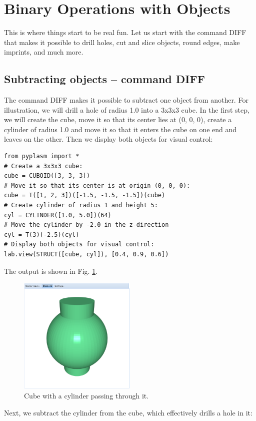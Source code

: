\documentclass[article,A4,12pt]{llncs}
\begin{document}
\section{Binary Operations with Objects}

This is where things start to be real fun. Let us start with the 
command DIFF that makes it possible to drill holes, cut and slice objects, 
round edges, make imprints, and much more.

\subsection{Subtracting objects -- command DIFF}

The command DIFF makes it possible to subtract one object from another.
For illustration, we will drill a hole of radius 1.0 into a 3x3x3 cube. In the first step,
we will create the cube, move it so that its center lies at (0, 0, 0), create
a cylinder of radius 1.0 and move it so that it enters the cube on one end and 
leaves on the other. Then we display both objects for visual control:

\begin{verbatim}
from pyplasm import *
# Create a 3x3x3 cube:
cube = CUBOID([3, 3, 3])
# Move it so that its center is at origin (0, 0, 0):
cube = T([1, 2, 3])([-1.5, -1.5, -1.5])(cube)
# Create cylinder of radius 1 and height 5:
cyl = CYLINDER([1.0, 5.0])(64)
# Move the cylinder by -2.0 in the z-direction 
cyl = T(3)(-2.5)(cyl)
# Display both objects for visual control:
lab.view(STRUCT([cube, cyl]), [0.4, 0.9, 0.6])
\end{verbatim}
The output is shown in Fig. \ref{fig:diff-1}.

\begin{figure}[!ht]
\begin{center}
\includegraphics[width=0.5\textwidth]{img/diff-1.png}
\end{center}
\vspace{-2mm}
\caption{Cube with a cylinder passing through it.}
\label{fig:diff-1}
\end{figure}
\noindent
Next, we subtract the cylinder from the cube, which effectively 
drills a hole in it:
\end{document}
